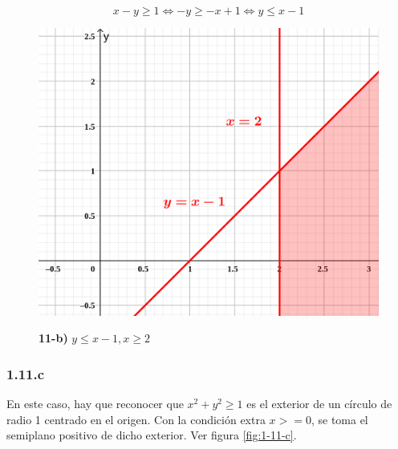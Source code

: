 \documentclass{article}
\begin{document}
\begin{equation}
x - y \geq 1 \Leftrightarrow -y \geq -x + 1 \Leftrightarrow y \leq x - 1
\end{equation}

\begin{figure}[ht]
\caption{\textbf{11-b)} $y \leq x - 1, x \geq 2$}
\includegraphics[scale=1.75]{img/ejercicios/1/11-b.png} 
\centering
\label{fig:1-11-b}
\end{figure}

\subsubsection*{1.11.c}
\label{subsubsec:1.11.c}

En este caso, hay que reconocer que $x^2 + y^2 \geq 1$ es el exterior de un círculo de radio 1 centrado en el origen. Con la condición extra $x >= 0$, se toma el semiplano positivo de dicho exterior. Ver figura \ref{fig:1-11-c}.
\end{document}
